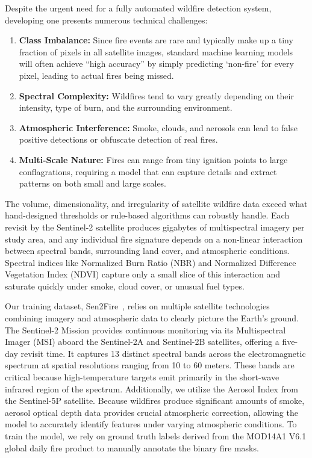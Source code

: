 \documentclass{article}
\begin{document}
Despite the urgent need for a fully automated wildfire detection system, developing one presents numerous technical challenges:

\begin{enumerate}
    \item \textbf{Class Imbalance:} Since fire events are rare and typically make up a tiny fraction of pixels in all satellite images, standard machine learning models will often achieve ``high accuracy'' by simply predicting `non-fire' for every pixel, leading to actual fires being missed.
    \item \textbf{Spectral Complexity:} Wildfires tend to vary greatly depending on their intensity, type of burn, and the surrounding environment.
    \item \textbf{Atmospheric Interference:} Smoke, clouds, and aerosols can lead to false positive detections or obfuscate detection of real fires.
    \item \textbf{Multi-Scale Nature:} Fires can range from tiny ignition points to large conflagrations, requiring a model that can capture details and extract patterns on both small and large scales.
\end{enumerate}

The volume, dimensionality, and irregularity of satellite wildfire data exceed what hand-designed thresholds or rule-based algorithms can robustly handle. Each revisit by the Sentinel-2 satellite produces gigabytes of multispectral imagery per study area, and any individual fire signature depends on a non-linear interaction between spectral bands, surrounding land cover, and atmospheric conditions. Spectral indices like Normalized Burn Ratio (NBR) and Normalized Difference Vegetation Index (NDVI) capture only a small slice of this interaction and saturate quickly under smoke, cloud cover, or unusual fuel types. 

Our training dataset, Sen2Fire~\cite{sen2fire}, relies on multiple satellite technologies combining imagery and atmospheric data to clearly picture the Earth's ground. The Sentinel-2 Mission provides continuous monitoring via its Multispectral Imager (MSI) aboard the Sentinel-2A and Sentinel-2B satellites, offering a five-day revisit time. It captures 13 distinct spectral bands across the electromagnetic spectrum at spatial resolutions ranging from 10 to 60 meters. These bands are critical because high-temperature targets emit primarily in the short-wave infrared region of the spectrum. Additionally, we utilize the Aerosol Index from the Sentinel-5P satellite. Because wildfires produce significant amounts of smoke, aerosol optical depth data provides crucial atmospheric correction, allowing the model to accurately identify features under varying atmospheric conditions. To train the model, we rely on ground truth labels derived from the MOD14A1 V6.1 global daily fire product to manually annotate the binary fire masks.
\end{document}
